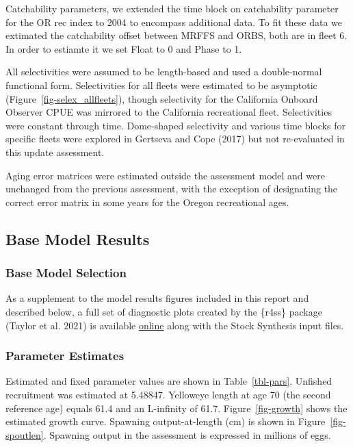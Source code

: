 \documentclass[
]{scrartcl}
\begin{document}
Catchability parameters, we extended the time block on catchability
parameter for the OR rec index to 2004 to encompass additional data. To
fit these data we extimated the catchability offset between MRFFS and
ORBS, both are in fleet 6. In order to estiamte it we set Float to 0 and
Phase to 1.

All selectivities were assumed to be length-based and used a
double-normal functional form. Selectivities for all fleets were
estimated to be asymptotic (Figure~\ref{fig-selex_allfleets}), though
selectivity for the California Onboard Observer CPUE was mirrored to the
California recreational fleet. Selectivities were constant through time.
Dome-shaped selectivity and various time blocks for specific fleets were
explored in Gertseva and Cope (2017) but not re-evaluated in this update
assessment.

Aging error matrices were estimated outside the assessment model and
were unchanged from the previous assessment, with the exception of
designating the correct error matrix in some years for the Oregon
recreational ages.

\subsection{Base Model Results}\label{base-model-results}

\subsubsection{Base Model Selection}\label{base-model-selection}

As a supplement to the model results figures included in this report and
described below, a full set of diagnostic plots created by the \{r4ss\}
package (Taylor et al. 2021) is available
\href{https://github.com/rclairer/Sebastes_ruberrimus_2025}{online}
along with the Stock Synthesis input files.

\subsubsection{Parameter Estimates}\label{parameter-estimates}

Estimated and fixed parameter values are shown in Table~\ref{tbl-pars}.
Unfished recruitment was estimated at 5.48847. Yelloweye length at age
70 (the second reference age) equals 61.4 and an L-infinity of 61.7.
Figure~\ref{fig-growth} shows the estimated growth curve. Spawning
output-at-length (cm) is shown in Figure~\ref{fig-spoutlen}. Spawning
output in the assessment is expressed in millions of eggs.
\end{document}
